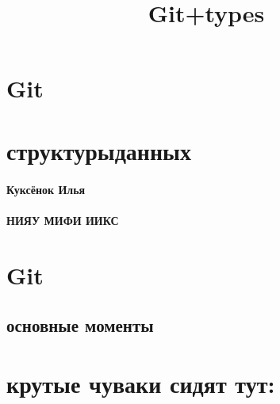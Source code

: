 \documentclass[11pt]{article}
\title{Git+types}
\begin{document}
    
    
    \maketitle
    
    

    
    \hypertarget{git}{%
\section{Git}\label{git}}

\hypertarget{ux441ux442ux440ux443ux43aux442ux443ux440ux44bux434ux430ux43dux43dux44bux445}{%
\section{структурыданных}\label{ux441ux442ux440ux443ux43aux442ux443ux440ux44bux434ux430ux43dux43dux44bux445}}

\hypertarget{ux43aux443ux43aux441ux451ux43dux43eux43a-ux438ux43bux44cux44f}{%
\paragraph{Куксёнок
Илья}\label{ux43aux443ux43aux441ux451ux43dux43eux43a-ux438ux43bux44cux44f}}

\hypertarget{ux43dux438ux44fux443-ux43cux438ux444ux438-ux438ux438ux43aux441}{%
\paragraph{НИЯУ МИФИ
ИИКС}\label{ux43dux438ux44fux443-ux43cux438ux444ux438-ux438ux438ux43aux441}}

    \hypertarget{git}{%
\section{Git}\label{git}}

\hypertarget{ux43eux441ux43dux43eux432ux43dux44bux435-ux43cux43eux43cux435ux43dux442ux44b}{%
\subsection{основные
моменты}\label{ux43eux441ux43dux43eux432ux43dux44bux435-ux43cux43eux43cux435ux43dux442ux44b}}

    \hypertarget{ux43aux440ux443ux442ux44bux435-ux447ux443ux432ux430ux43aux438-ux441ux438ux434ux44fux442-ux442ux443ux442}{%
\section{крутые чуваки сидят
тут:}\label{ux43aux440ux443ux442ux44bux435-ux447ux443ux432ux430ux43aux438-ux441ux438ux434ux44fux442-ux442ux443ux442}}
\end{document}
